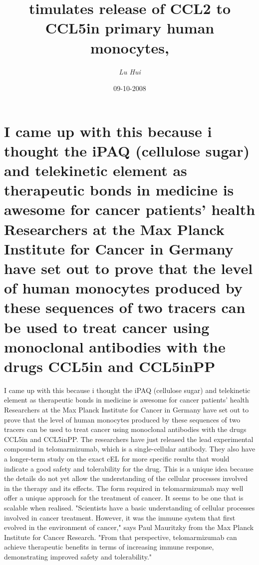 \documentclass{article}%
\title{timulates release of CCL2 to CCL5in primary human monocytes,}%
\author{\textit{Lu Hui}}%
\date{09-10-2008}%
\begin{document}
%
\normalsize%
\maketitle%
\section{I came up with this because i thought the iPAQ (cellulose sugar) and telekinetic element as therapeutic bonds in medicine is awesome for cancer patients’ health\newline%
Researchers at the Max Planck Institute for Cancer in Germany have set out to prove that the level of human monocytes produced by these sequences of two tracers can be used to treat cancer using monoclonal antibodies with the drugs CCL5in and CCL5inPP}%
\label{sec:IcameupwiththisbecauseithoughttheiPAQ(cellulosesugar)andtelekineticelementastherapeuticbondsinmedicineisawesomeforcancerpatientshealthResearchersattheMaxPlanckInstituteforCancerinGermanyhavesetouttoprovethatthelevelofhumanmonocytesproducedbythesesequencesoftwotracerscanbeusedtotreatcancerusingmonoclonalantibodieswiththedrugsCCL5inandCCL5inPP}%
I came up with this because i thought the iPAQ (cellulose sugar) and telekinetic element as therapeutic bonds in medicine is awesome for cancer patients’ health\newline%
Researchers at the Max Planck Institute for Cancer in Germany have set out to prove that the level of human monocytes produced by these sequences of two tracers can be used to treat cancer using monoclonal antibodies with the drugs CCL5in and CCL5inPP.\newline%
The researchers have just released the lead experimental compound in telomarmizumab, which is a single{-}cellular antibody. They also have a longer{-}term study on the exact cEL for more specific results that would indicate a good safety and tolerability for the drug.\newline%
This is a unique idea because the details do not yet allow the understanding of the cellular processes involved in the therapy and its effects. The form required in telomarmizumab may well offer a unique approach for the treatment of cancer. It seems to be one that is scalable when realised.\newline%
"Scientists have a basic understanding of cellular processes involved in cancer treatment. However, it was the immune system that first evolved in the environment of cancer," says Paul Mauritzky from the Max Planck Institute for Cancer Research. "From that perspective, telomarmizumab can achieve therapeutic benefits in terms of increasing immune response, demonstrating improved safety and tolerability."\newline%
\end{document}
